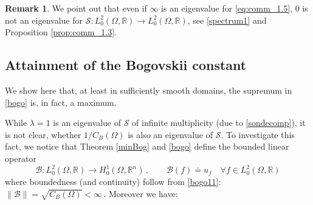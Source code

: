 \documentclass[11pt]{article}
\theoremstyle{plain}
\theoremstyle{definition}
\newtheorem{remark}[theorem]{Remark}
\numberwithin{equation}{section}
\newcommand{\R}{\mathbb{R}}
\begin{document}
\begin{remark}\label{0infty} We point out that even if $\infty$ is an eigenvalue for \eqref{eq:comm_1.5}, $0$ is not an eigenvalue
for $\mathcal{S} : L_{0}^{2}(\Omega,\R) \longrightarrow L_{0}^{2}(\Omega,\R)$, see \eqref{spectrum1} and Proposition \ref{prop:comm_1.3}.
\end{remark}

\subsection{Attainment of the Bogovskii constant}

We show here that, at least in sufficiently smooth domains, the supremum in \eqref{bogo} is, in fact, a maximum.

While $\lambda =1$ is an eigenvalue of $\mathcal{S}$ of infinite multiplicity (due to \eqref{sondecomp}), it is not clear, whether $1/C_{B}(\Omega)$ is also an eigenvalue of $\mathcal{S}$.
To investigate this fact, we notice that Theorem \ref{minBog} and \eqref{bogo} define the bounded linear operator
$$\mathcal{B} : L_{0}^{2}(\Omega,\R) \longrightarrow H_0^1(\Omega,\R^n)\, ,\qquad \mathcal{B}(f) \doteq u_{f}\quad\forall f\in L^2_0(\Omega,\R)$$
where boundedness (and continuity) follow from \eqref{bogo11}:
$
\| \mathcal{B} \| = \sqrt{C_B(\Omega)}<\infty\, .
$ Moreover we have:
\end{document}
